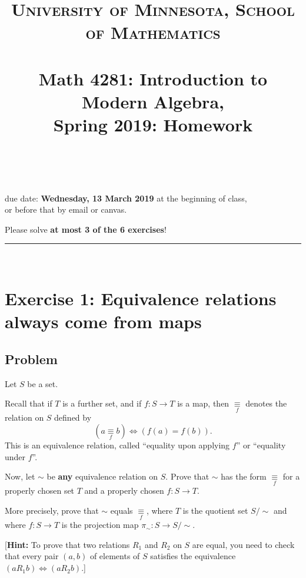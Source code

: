 \documentclass[paper=a4, fontsize=12pt]{scrartcl} %
\title{	
\normalfont \normalsize 
\textsc{University of Minnesota, School of Mathematics} \\ [25pt] %
\horrule{0.5pt} \\[0.4cm] %
\huge Math 4281: Introduction to Modern Algebra, \\
Spring 2019:
Homework \psetnumber\\%
\horrule{2pt} \\[0.5cm] %
}
\author{\myname}
\newcommand{\tup}[1]{\left( #1 \right)}
\newcommand{\mapeq}[1]{\underset{#1}{\equiv}}
\newcommand{\horrule}[1]{\rule{\linewidth}{#1}} %
\theoremstyle{plainsl}
\theoremstyle{definition}
\theoremstyle{remark}
\begin{document}
\maketitle %

\begin{center} %
{\large due date: \textbf{Wednesday, 13 March 2019} at the beginning of class, \\
or before that by email or canvas.

Please solve \textbf{at most 3 of the 6 exercises}!}
\end{center}

\horrule{0.3pt} \\[0.4cm]

\section{Exercise 1: Equivalence relations always come from maps}

\subsection{Problem}

Let $S$ be a set.

Recall that if $T$ is a further set, and if $f : S \to T$
is a map, then $\mapeq{f}$
denotes the relation on $S$ defined by
\[
\tup{ a \mapeq{f} b }
\iff %
\tup{ f\tup{a} = f\tup{b} }.
\]
This is an equivalence relation, called ``equality upon
applying $f$'' or ``equality under $f$''.

Now, let $\sim$ be \textbf{any} equivalence relation on $S$.
Prove that $\sim$ has the form $\mapeq{f}$ for a properly
chosen set $T$ and a properly chosen $f : S \to T$.

More precisely, prove that $\sim$ equals $\mapeq{f}$,
where $T$ is the quotient set $S / \sim$ and where
$f : S \to T$ is the projection map
$\pi_\sim : S \to S / \sim$.

[\textbf{Hint:} To prove that two relations $R_1$ and $R_2$
on $S$ are equal, you need to check that every pair
$\tup{a, b}$ of elements of $S$ satisfies the equivalence
$\tup{a R_1 b} \iff \tup{a R_2 b}$.]
\end{document}
